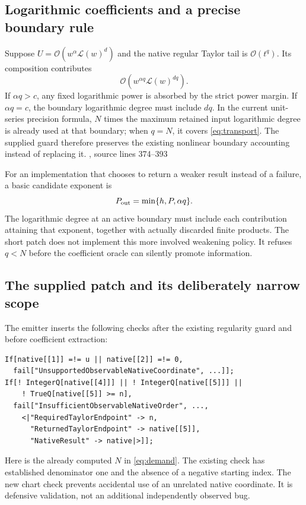 \documentclass[11pt,letterpaper]{article}
\newcommand{\OO}{\mathcal{O}}
\newcommand{\LL}{\mathcal{L}}
\newcommand{\src}[2]{\cite{#1}, source lines #2}
\theoremstyle{definition}\newtheorem{definition}[proposition]{Definition}
\begin{document}
\subsection{Logarithmic coefficients and a precise boundary rule}
Suppose $U=\OO(w^\alpha\LL(w)^d)$ and the native regular Taylor tail is
$\OO(t^q)$. Its composition contributes
\begin{equation}\label{eq:transport}
 \OO\!\left(w^{\alpha q}\LL(w)^{dq}\right).
\end{equation}
If $\alpha q>c$, any fixed logarithmic power is absorbed by the strict power
margin. If $\alpha q=c$, the boundary logarithmic degree must include $dq$.
In the current unit-series precision formula, $N$ times the maximum retained
input logarithmic degree is already used at that boundary; when $q=N$, it
covers \eqref{eq:transport}. The supplied guard therefore preserves the
existing nonlinear boundary accounting instead of replacing it.
\src{core}{374--393}

For an implementation that chooses to return a weaker result instead of a
failure, a basic candidate exponent is
\begin{equation}
 P_{\rm out}=\min\{h,P,\alpha q\}.
\end{equation}
The logarithmic degree at an active boundary must include each contribution
attaining that exponent, together with actually discarded finite products.
The short patch does not implement this more involved weakening policy. It
refuses $q<N$ before the coefficient oracle can silently promote information.

\subsection{The supplied patch and its deliberately narrow scope}
The emitter inserts the following checks after the existing regularity guard
and before coefficient extraction:
\begin{lstlisting}
If[native[[1]] =!= u || native[[2]] =!= 0,
  fail["UnsupportedObservableNativeCoordinate", ...]];
If[! IntegerQ[native[[4]]] || ! IntegerQ[native[[5]]] ||
    ! TrueQ[native[[5]] >= n],
  fail["InsufficientObservableNativeOrder", ...,
    <|"RequiredTaylorEndpoint" -> n,
      "ReturnedTaylorEndpoint" -> native[[5]],
      "NativeResult" -> native|>]];
\end{lstlisting}
Here  is the already computed $N$ in \eqref{eq:demand}. The existing
check has established denominator one and the absence of a negative starting
index. The new chart check prevents accidental use of an unrelated native
coordinate. It is defensive validation, not an additional independently
observed bug.
\end{document}
